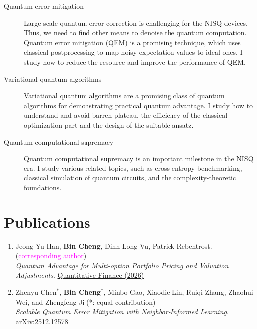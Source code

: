\documentclass[margin,line,a4paper]{resume}
\newcommand{\lightblue}[1]{\textcolor{blue!60!cyan}{#1}}
\newcommand{\magenta}[1]{\textcolor{magenta}{#1}}
\begin{document}
\begin{resume}
\begin{description}
    \item[Quantum error mitigation] Large-scale quantum error correction is challenging for the NISQ devices. Thus, we need to find other means to denoise the quantum computation. Quantum error mitigation (QEM) is a promising technique, which uses classical postprocessing to map noisy expectation values to ideal ones. I study how to reduce the resource and improve the performance of QEM.

    \item[Variational quantum algorithms] Variational quantum algorithms are a promising class of quantum algorithms for demonstrating practical quantum advantage. I study how to understand and avoid barren plateau, the efficiency of the classical optimization part and the design of the suitable ansatz.

    \item[Quantum computational supremacy] Quantum computational supremacy is an important milestone in the NISQ era. I study various related topics, such as cross-entropy benchmarking, classical simulation of quantum circuits, and the complexity-theoretic foundations.
    
\end{description}
\fi


\section{\mysidestyle Publications}\vspace{1mm}

\begin{enumerate}
    \item Jeong Yu Han, \textbf{Bin Cheng}, Dinh-Long Vu, Patrick Rebentrost. (\magenta{corresponding author}) \\
    \emph{Quantum Advantage for Multi-option Portfolio Pricing and Valuation Adjustments}. \href{https://www.tandfonline.com/doi/full/10.1080/14697688.2026.2614573}{Quantitative Finance (2026)}
    
    \item Zhenyu Chen$^*$, \textbf{Bin Cheng}$^*$, Minbo Gao, Xiaodie Lin, Ruiqi Zhang, Zhaohui Wei, and Zhengfeng Ji (\lightblue{*: equal contribution}) \\
    \emph{Scalable Quantum Error Mitigation with Neighbor-Informed Learning}. \href{https://arxiv.org/abs/2512.12578}{arXiv:2512.12578}
    

\end{enumerate}
\end{resume}
\end{document}
